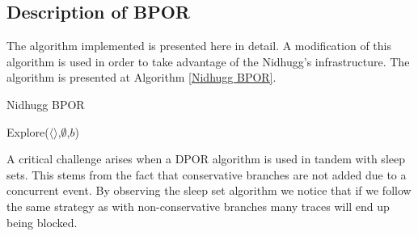 \subsection{Description of BPOR}
The algorithm implemented is presented here \cite{BPOR} in detail. A modification of this algorithm is used in order to take advantage of the Nidhugg's infrastructure.
The algorithm is presented at Algorithm \ref{Nidhugg BPOR}.


\begin{algorithm}
    \caption{Nidhugg BPOR}
    \label{Nidhugg BPOR}
    Explore($\langle \rangle$,$\emptyset$,$b$)\;
\end{algorithm}

A critical challenge arises when a DPOR algorithm is used in tandem with sleep sets. This stems from the fact that conservative branches are not added due to a
concurrent event. By observing the sleep set algorithm we notice that if we follow the same strategy as with non-conservative branches many traces will end up being blocked.

